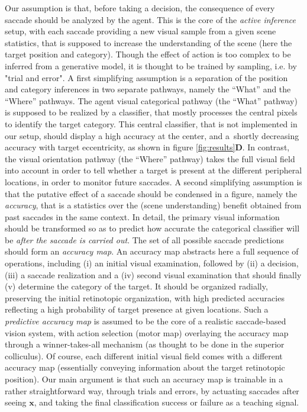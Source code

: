 \CNS
Our assumption is that, before taking a decision, the consequence of every saccade should be analyzed by the agent. This is the core of the \emph{active inference} setup, with each saccade providing a new visual sample from a given scene statistics, that is supposed to increase the understanding of the scene (here the target position and category). Though the effect of action is too complex to be inferred from a generative model, it is thought to be trained by sampling, i.e. by "trial and error". A first simplifying assumption is a separation of the position and category inferences in two separate pathways, namely the ``What'' and the ``Where'' pathways. The agent visual categorical pathway (the ``What'' pathway) is supposed to be realized by a classifier, that mostly processes the central pixels to identify the target category. This central classifier, that is not implemented in our setup, should display a high accuracy at the center, and a shortly decreasing accuracy with target eccentricity, as shown in figure \ref{fig:results}{\bf D}.
In contrast, the visual orientation pathway (the ``Where'' pathway) takes the full visual field into account in order to tell whether a target is present at the different peripheral locations, in order to monitor future saccades. 
A second simplifying assumption is that the putative effect of a saccade should be condensed in a figure, namely the \emph{accuracy}, that is a statistics over the (scene understanding) benefit obtained from past saccades in the same context. In detail, the primary visual information should be transformed so as to predict how accurate the categorical classifier will be \emph{after the saccade is carried out}. The set of all possible saccade predictions should form an \emph{accuracy map}.
An accuracy map abstracts here a full sequence of operations, including (i) an initial visual examination, followed by (ii) a decision, (iii) a saccade realization and a (iv) second visual examination that should finally (v) determine the category of the target. 
It should be organized radially, preserving the initial retinotopic organization, with high predicted accuracies reflecting a high probability of target presence at given locations. 
Such  a \emph{predictive accuracy map} is assumed to be the core of
a realistic saccade-based vision system, with action selection (motor map) overlaying the accuracy map through a winner-takes-all mechanism (as thought to be done in the superior colliculus). Of course, each different initial visual field comes with a different accuracy map (essentially conveying information about the target retinotopic position).
Our main argument is that such an accuracy map is trainable in a rather straightforward way, through trials and errors, by actuating saccades after seeing $\boldsymbol{x}$, and taking the final classification success or failure as a teaching signal. 
\fi

